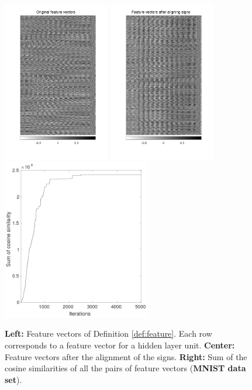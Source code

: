 \documentclass{article}
\begin{document}
\begin{figure}[t]
\centering
\includegraphics[height=70mm]{mnist_v_corr1.png}\hspace{2mm}
\includegraphics[height=70mm]{mnist_v_corr2.png}\hspace{2mm}
\includegraphics[height=70mm]{mnist_v_corr3.png}
\caption{\textbf{Left:} Feature vectors of Definition \ref{def:feature}. Each row corresponds to a feature vector for a hidden layer unit. \textbf{Center: } Feature vectors after the alignment of the signs. \textbf{Right: } Sum of the cosine similarities of all the pairs of feature vectors (\textbf{MNIST data set}). }\vspace{5mm}

\end{figure}
\end{document}
